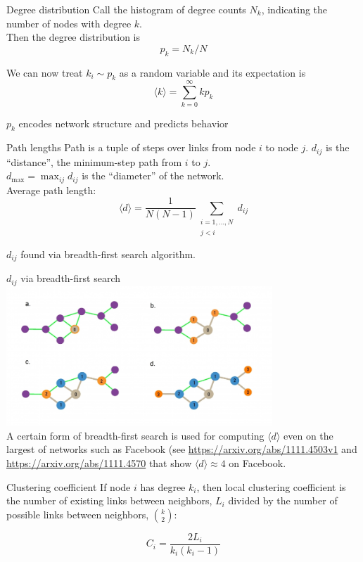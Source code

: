 \documentclass{beamer}
\begin{document}
\begin{frame}{Degree distribution}
  Call the histogram of degree counts $N_k$, indicating the number of nodes
  with degree $k$. \\[1em]

  Then the degree distribution is
  \[ p_k = N_k / N \]

  We can now treat $k_i \sim p_k$ as a random variable and its expectation is
  \[ \langle k \rangle = \sum_{k=0}^\infty k p_k \]

  $p_k$ encodes network structure and predicts behavior
\end{frame}



\begin{frame}{Path lengths}
  Path is a tuple of steps over links from node $i$ to node $j$. 
  $d_{ij}$ is the ``distance'', the minimum-step path from $i$ to $j$. \\[1em]
  $d_\text{max} = \max_{ij} d_{ij}$ is the ``diameter'' of the network.  \\[1em]

  Average path length:
  \[ \langle d \rangle = \frac{1}{N(N-1)} \sum_{\substack{i=1,\ldots,N \\ j < i}} d_{ij} \]
  
  $d_{ij}$ found via breadth-first search algorithm.
\end{frame}

\begin{frame}{$d_{ij}$ via breadth-first search}
  \centering
  \includegraphics[width=0.75\textwidth]{Figures/bfs.jpg} \\
  A certain form of breadth-first search is used for computing 
  $\langle d \rangle$ even on the largest of networks such as Facebook
  (see \url{https://arxiv.org/abs/1111.4503v1} and 
  \url{https://arxiv.org/abs/1111.4570} that show $\langle d \rangle \approx 4$
  on Facebook.
\end{frame}

\begin{frame}{Clustering coefficient}
  If node $i$ has degree $k_i$, then local clustering coefficient is
  the number of existing links between neighbors, $L_i$ divided by 
  the number of possible links between neighbors, ${k \choose 2}$:

  \[ C_i = \frac{2 L_i}{k_i(k_i - 1)} \]
\end{frame}
\end{document}
